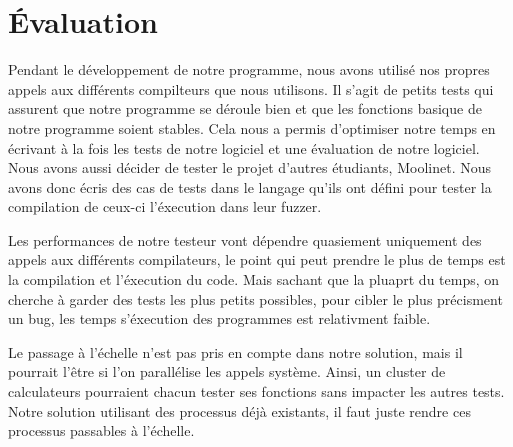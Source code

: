 \chapter{Évaluation}

Pendant le développement de notre programme, nous avons utilisé nos propres appels aux différents compilteurs que nous utilisons. Il s'agit de petits
tests qui assurent que notre programme se déroule bien et que les fonctions basique de notre programme soient stables. Cela nous a permis d'optimiser
notre temps en écrivant à la fois les tests de notre logiciel et une évaluation de notre logiciel. Nous avons aussi décider de tester le projet 
d'autres étudiants, Moolinet. Nous avons donc écris des cas de tests dans le langage qu'ils ont défini pour tester la compilation de ceux-ci l'éxecution
dans leur fuzzer.


Les performances de notre testeur vont dépendre quasiement uniquement des appels aux différents compilateurs, le point
qui peut prendre le plus de temps est la compilation et l'éxecution du code. Mais sachant que la pluaprt du temps,
on cherche à garder des tests les plus petits possibles, pour cibler le plus précisment un bug, les temps s'éxecution des programmes est 
relativment faible.

Le passage à l'échelle n'est pas pris en compte dans notre solution, mais il pourrait
l'être si l'on parallélise les appels système. Ainsi, un cluster de calculateurs
pourraient chacun tester ses fonctions sans impacter les autres tests. Notre
solution utilisant des processus déjà existants, il faut juste rendre ces processus
passables à l'échelle.
